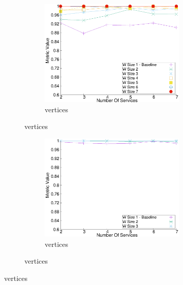 \begin{figure}[H]
\begin{adjustbox}{minipage=\linewidth,scale=0.75}
\begin{subfigure}{0.45\textwidth}
        \begin{subfigure}{\textwidth}
          \includegraphics[width=\textwidth]{Images/graphs/window_quality_performance_diff_qual_n7_s7_20_100_n7}
          \caption{ vertices}
          \label{fig:quality_window_wide_qualitative_n7}
        \end{subfigure}
      \end{subfigure}
      \begin{subfigure}{0.45\textwidth}
        \begin{subfigure}{\textwidth}
          \includegraphics[width=\textwidth]{Images/graphs/window_quality_performance_diff_qual_n7_s7_50_80_n3}
          \caption{ vertices}
          \label{fig:quality_window_average_qualitative_n3}
        \end{subfigure}


\end{subfigure}
\end{adjustbox}
\end{figure}
